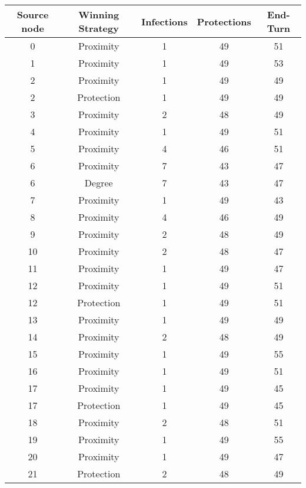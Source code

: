 \documentclass[results.tex]{subfiles}
\begin{document}
\begin{center}
  \begin{tabular}{| c || c | c | c | c |}
    \hline
    {\bfseries Source node} & {\bfseries Winning Strategy} & {\bfseries Infections} & {\bfseries Protections} & {\bfseries End-Turn} \\  %
    \hline\hline
    0 & Proximity & 1 & 49 & 51 \\ 
    \hline
    1 & Proximity & 1 & 49 & 53 \\ 
    \hline
    2 & Proximity & 1 & 49 & 49 \\ 
    \hline
    2 & Protection & 1 & 49 & 49 \\ 
    \hline
    3 & Proximity & 2 & 48 & 49 \\ 
    \hline
    4 & Proximity & 1 & 49 & 51 \\ 
    \hline
    5 & Proximity & 4 & 46 & 51 \\ 
    \hline
    6 & Proximity & 7 & 43 & 47 \\ 
    \hline
    6 & Degree & 7 & 43 & 47 \\ 
    \hline
    7 & Proximity & 1 & 49 & 43 \\ 
    \hline
    8 & Proximity & 4 & 46 & 49 \\ 
    \hline
    9 & Proximity & 2 & 48 & 49 \\ 
    \hline
    10 & Proximity & 2 & 48 & 47 \\ 
    \hline
    11 & Proximity & 1 & 49 & 47 \\ 
    \hline
    12 & Proximity & 1 & 49 & 51 \\ 
    \hline
    12 & Protection & 1 & 49 & 51 \\ 
    \hline
    13 & Proximity & 1 & 49 & 49 \\ 
    \hline
    14 & Proximity & 2 & 48 & 49 \\ 
    \hline
    15 & Proximity & 1 & 49 & 55 \\ 
    \hline
    16 & Proximity & 1 & 49 & 51 \\ 
    \hline
    17 & Proximity & 1 & 49 & 45 \\ 
    \hline
    17 & Protection & 1 & 49 & 45 \\ 
    \hline
    18 & Proximity & 2 & 48 & 51 \\ 
    \hline
    19 & Proximity & 1 & 49 & 55 \\ 
    \hline
    20 & Proximity & 1 & 49 & 47 \\ 
    \hline
    21 & Protection & 2 & 48 & 49 \\ 

\end{tabular}
\end{center}
\end{document}
